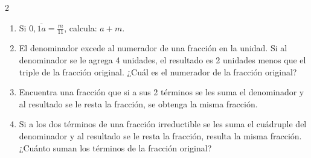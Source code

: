 \documentclass[10pt]{article}
\begin{document}
\begin{multicols}{2}
\begin{enumerate}[label=\textbf{\arabic*.}, itemsep=0.4cm]
			\item Si \(0,\overline{1a} = \frac{m}{11}\), calcula: \(a + m\).


			\item El denominador excede al numerador de una fracción en la unidad. Si al denominador se le agrega 4 unidades, el resultado es 2 unidades menos que el triple de la fracción original. ¿Cuál es el numerador de la fracción original?

			\item Encuentra una fracción que si a sus 2 términos se les suma el denominador y al resultado se le resta la fracción, se obtenga la misma fracción.

			\item Si a los dos términos de una fracción irreductible se les suma el cuádruple del denominador y al resultado se le resta la fracción, resulta la misma fracción. ¿Cuánto suman los términos de la fracción original?


		\end{enumerate}

\end{multicols}
\end{document}

